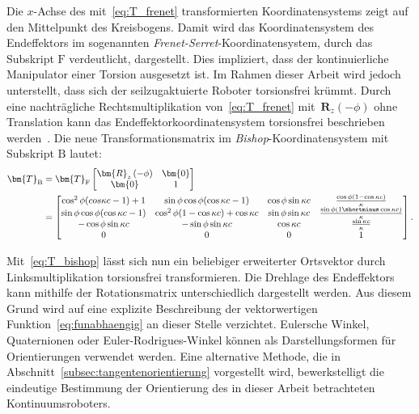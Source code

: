 Die \mbox{$x$-Achse} des mit~\eqref{eq:T_frenet} transformierten Koordinatensystems zeigt auf den Mittelpunkt des Kreisbogens. Damit wird das Koordinatensystem des Endeffektors im sogenannten \textit{Frenet-Serret}-Koordinatensystem, durch das Subskript $\mathrm{F}$ verdeutlicht, dargestellt. Dies impliziert, dass der kontinuierliche Manipulator einer Torsion ausgesetzt ist. Im Rahmen dieser Arbeit wird jedoch unterstellt, dass sich der seilzugaktuierte Roboter torsionsfrei krümmt. Durch eine nachträgliche Rechtsmultiplikation von~\eqref{eq:T_frenet} \mbox{mit $\bm{R}_z(-\phi)$} ohne Translation kann das Endeffektorkoordinatensystem torsionsfrei beschrieben werden~\cite{WIJ10}. Die neue Transformationsmatrix im \textit{Bishop}-Koordinatensystem mit Subskript $\mathrm{B}$ lautet:
\begin{align}
\bm{T}_\mathrm{B} &=  \bm{T}_{\mathrm{F}}
\begin{bmatrix}
\bm{R}_z\left( -\phi \right) & \bm{0}\\
\bm{0} & 1 
\end{bmatrix} \nonumber \\
&=\begin{bmatrix}
\cos^2\phi(cos\kappa c - 1)+1 & \sin\phi\cos\phi (\cos\kappa c -1) & \cos\phi \sin\kappa c & \frac{\cos\phi(1-\cos\kappa c)}{\kappa} \\
\sin\phi \cos\phi (\cos\kappa c-1) & \cos^2\phi(1-\cos\kappa c)+\cos\kappa c & \sin\phi \sin\kappa c & \frac{\sin\phi(1 \shortminus \cos\kappa c)}{\kappa} \\
-\cos\phi \sin\kappa c & -\sin\phi \sin\kappa c & \cos\kappa c & \frac{\sin\kappa c}{\kappa} \\
0 & 0 & 0 & 1 
\end{bmatrix}.
\label{eq:T_bishop}
\end{align}

Mit~\eqref{eq:T_bishop} lässt sich nun ein beliebiger erweiterter Ortsvektor durch Linksmultiplikation torsionsfrei transformieren. 
Die Drehlage des Endeffektors kann mithilfe der Rotationsmatrix unterschiedlich dargestellt werden. Aus diesem Grund wird auf eine explizite Beschreibung der vektorwertigen Funktion~\eqref{eq:funabhaengig} an dieser Stelle verzichtet. Eulersche Winkel, Quaternionen oder Euler-Rodrigues-Winkel können als Darstellungsformen für Orientierungen verwendet werden. Eine alternative Methode, die in Abschnitt~\ref{subsec:tangentenorientierung} vorgestellt wird, bewerkstelligt die eindeutige Bestimmung der Orientierung des in dieser Arbeit betrachteten Kontinuumsroboters.


